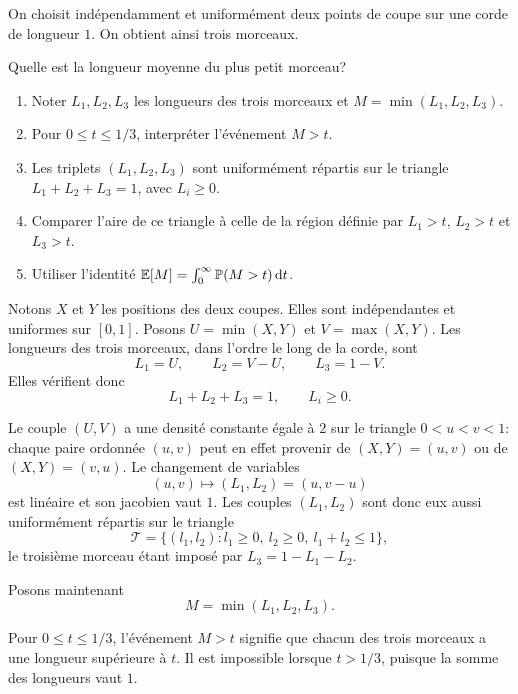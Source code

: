 \documentclass[11pt,a4paper]{article}
\begin{document}

\begin{statementbox}
On choisit indépendamment et uniformément deux points de coupe sur une corde
de longueur $1$. On obtient ainsi trois morceaux.

Quelle est la longueur moyenne du plus petit morceau?
\end{statementbox}

\begin{hintsbox}
\begin{enumerate}
  \item Noter $L_1,L_2,L_3$ les longueurs des trois morceaux et
  $M=\min(L_1,L_2,L_3)$.
  \item Pour $0\leq t\leq 1/3$, interpréter l'événement $M>t$.
  \item Les triplets $(L_1,L_2,L_3)$ sont uniformément répartis sur le
  triangle $L_1+L_2+L_3=1$, avec $L_i\geq0$.
  \item Comparer l'aire de ce triangle à celle de la région définie par
  $L_1>t$, $L_2>t$ et $L_3>t$.
  \item Utiliser l'identité
  $\mathbb E[M]=\int_0^{\infty}\mathbb P(M>t)\,\mathrm dt$.
\end{enumerate}
\end{hintsbox}

\correction

Notons $X$ et $Y$ les positions des deux coupes. Elles sont indépendantes et
uniformes sur $[0,1]$. Posons $U=\min(X,Y)$ et $V=\max(X,Y)$. Les longueurs
des trois morceaux, dans l'ordre le long de la corde, sont
\[
L_1=U,
\qquad
L_2=V-U,
\qquad
L_3=1-V.
\]
Elles vérifient donc
\[
L_1+L_2+L_3=1,
\qquad L_i\geq0.
\]

Le couple $(U,V)$ a une densité constante égale à $2$ sur le triangle
$0<u<v<1$: chaque paire ordonnée $(u,v)$ peut en effet provenir de
$(X,Y)=(u,v)$ ou de $(X,Y)=(v,u)$. Le changement de variables
\[
(u,v)\longmapsto (L_1,L_2)=(u,v-u)
\]
est linéaire et son jacobien vaut $1$. Les couples $(L_1,L_2)$ sont donc eux
aussi uniformément répartis sur le triangle
\[
\mathcal T
=\{(l_1,l_2):l_1\geq0,\ l_2\geq0,\ l_1+l_2\leq1\},
\]
le troisième morceau étant imposé par $L_3=1-L_1-L_2$.

Posons maintenant
\[
M=\min(L_1,L_2,L_3).
\]

Pour $0\leq t\leq1/3$, l'événement $M>t$ signifie que chacun des trois
morceaux a une longueur supérieure à $t$. Il est impossible lorsque
$t>1/3$, puisque la somme des longueurs vaut $1$.
\end{document}
